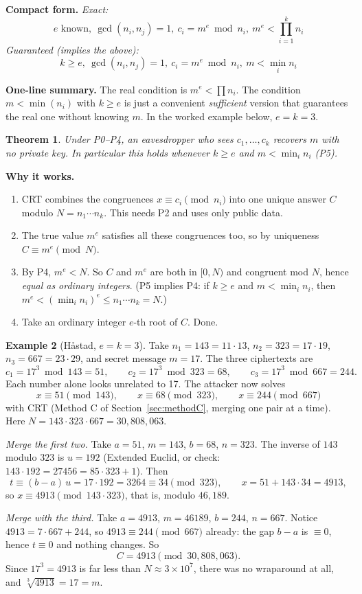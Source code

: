 \documentclass[11pt]{article}
\newtheorem{theorem}{Theorem}[section]
\theoremstyle{definition}
\newtheorem{example}[theorem]{Example}
\theoremstyle{remark}
\begin{document}
\textbf{Compact form.}
\emph{Exact:}
\[
\boxed{\;e\text{ known},\ \gcd(n_i,n_j)=1,\ c_i=m^e\bmod n_i,\ m^e<\prod_{i=1}^{k}n_i\;}
\]
\emph{Guaranteed (implies the above):}
\[
\boxed{\;k\ge e,\ \gcd(n_i,n_j)=1,\ c_i=m^e\bmod n_i,\ m<\min_i n_i\;}
\]

\textbf{One-line summary.} The real condition is $m^e<\prod n_i$. The condition $m<\min(n_i)$ with $k\ge e$ is just a convenient \emph{sufficient} version that guarantees the real one without knowing $m$. In the worked example below, $e=k=3$.

\begin{theorem}\label{thm:hastad}
Under P0--P4, an eavesdropper who sees $c_1,\dots,c_k$ recovers $m$ with no private key. In particular this holds whenever $k\ge e$ and $m<\min_i n_i$ (P5).
\end{theorem}

\textbf{Why it works.}
\begin{enumerate}[nosep]
\item CRT combines the congruences $x\equiv c_i \pmod{n_i}$ into one unique answer $C$ modulo $N=n_1\cdots n_k$. This needs P2 and uses only public data.
\item The true value $m^e$ satisfies all these congruences too, so by uniqueness $C\equiv m^e \pmod N$.
\item By P4, $m^e<N$. So $C$ and $m^e$ are both in $[0,N)$ and congruent mod $N$, hence \emph{equal as ordinary integers}. (P5 implies P4: if $k\ge e$ and $m<\min_i n_i$, then $m^e<(\min_i n_i)^e\le n_1\cdots n_k=N$.)
\item Take an ordinary integer $e$-th root of $C$. Done.
\end{enumerate}

\begin{example}[Håstad, $e=k=3$]\label{ex:hastad}
Take $n_1=143=11\cdot13$, $n_2=323=17\cdot19$, $n_3=667=23\cdot29$, and secret message $m=17$. The three ciphertexts are
\[
c_1=17^3\bmod143=51,\qquad c_2=17^3\bmod323=68,\qquad c_3=17^3\bmod667=244.
\]
Each number alone looks unrelated to 17. The attacker now solves
\[
x\equiv51\pmod{143},\qquad x\equiv68\pmod{323},\qquad x\equiv244\pmod{667}
\]
with CRT (Method C of Section~\ref{sec:methodC}, merging one pair at a time). Here $N=143\cdot323\cdot667=30{,}808{,}063$.

\emph{Merge the first two.} Take $a=51$, $m=143$, $b=68$, $n=323$. The inverse of $143$ modulo $323$ is $u=192$ (Extended Euclid, or check: $143\cdot192=27456=85\cdot323+1$). Then
\[
t\equiv(b-a)\,u=17\cdot192=3264\equiv34\pmod{323},\qquad x=51+143\cdot34=4913,
\]
so $x\equiv4913\pmod{143\cdot323}$, that is, modulo $46{,}189$.

\emph{Merge with the third.} Take $a=4913$, $m=46189$, $b=244$, $n=667$. Notice $4913=7\cdot667+244$, so $4913\equiv244\pmod{667}$ already: the gap $b-a$ is $\equiv0$, hence $t\equiv0$ and nothing changes. So
\[
C=4913\pmod{30{,}808{,}063}.
\]
Since $17^3=4913$ is far less than $N\approx 3\times10^7$, there was no wraparound at all, and $\sqrt[3]{4913}=17=m$.
\end{example}
\end{document}
